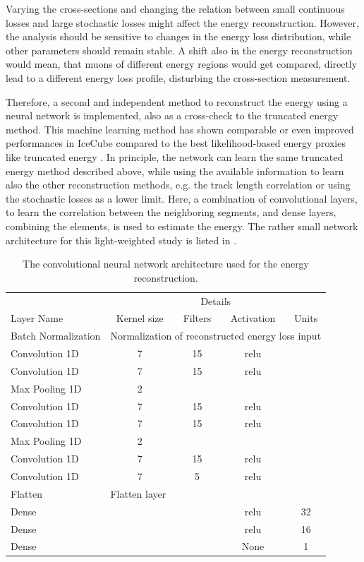 Varying the cross-sections and changing the relation between small continuous losses and large stochastic losses might affect the energy reconstruction.
However, the analysis should be sensitive to changes in the energy loss distribution, while other parameters should remain stable.
A shift also in the energy reconstruction would mean, that muons of different energy regions would get compared, directly lead to a different energy loss profile, disturbing the cross-section measurement.

Therefore, a second and independent method to reconstruct the energy using a neural network is implemented, also as a cross-check to the truncated energy method.
This machine learning method has shown comparable or even improved performances in IceCube compared to the best likelihood-based energy proxies like truncated energy \cite{Huennefeld17ICRC, Huennefeld19VLVNT}.
In principle, the network can learn the same truncated energy method described above, while using the available information to learn also the other reconstruction methods, e.g. the track length correlation or using the stochastic losses as a lower limit.
Here, a combination of convolutional layers, to learn the correlation between the neighboring segments, and dense layers, combining the elements, is used to estimate the energy.
The rather small network architecture for this light-weighted study is listed in .
\begin{table}
    \caption{The convolutional neural network architecture used for the energy reconstruction.}
    \label{tab:nn_layers_ereco}
    \centering
    \begin{tabular}{l | c c c c}
        \toprule
         & \multicolumn{4}{c}{Details} \\
        Layer Name & Kernel size & Filters & Activation & Units \\
        \midrule
        Batch Normalization & \multicolumn{4}{l}{Normalization of reconstructed energy loss input} \\ \cline{2-5}
        Convolution 1D & 7 & 15 & relu & \\
        Convolution 1D & 7 & 15 & relu & \\
        Max Pooling 1D & 2 & & & \\
        Convolution 1D & 7 & 15 & relu & \\
        Convolution 1D & 7 & 15 & relu & \\
        Max Pooling 1D & 2 & & & \\
        Convolution 1D & 7 & 15 & relu & \\
        Convolution 1D & 7 & 5  & relu & \\  \cline{2-5}
        Flatten & \multicolumn{4}{l}{Flatten layer} \\  \cline{2-5}
        Dense & & & relu & 32 \\
        Dense & & & relu & 16 \\
        Dense & & & None & 1\\
        \bottomrule                          
    \end{tabular}
\end{table}

